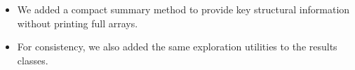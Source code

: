 \begin{itemize}
\item We added a compact summary method to provide key structural
information without printing full arrays.
\item For consistency, we also added the same exploration utilities to
the results classes.
\end{itemize}
